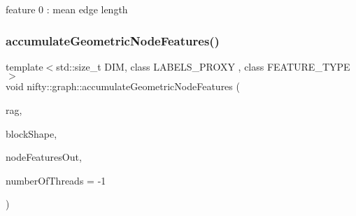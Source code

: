 feature 0 \+: mean edge length \mbox{\label{namespacenifty_1_1graph_a11bcf8795f57d9e5200fa52c1fb3a883}} 
\subsubsection{\texorpdfstring{accumulate\+Geometric\+Node\+Features()}{accumulateGeometricNodeFeatures()}}
{\footnotesize\ttfamily template$<$std\+::size\+\_\+t D\+IM, class L\+A\+B\+E\+L\+S\+\_\+\+P\+R\+O\+XY , class F\+E\+A\+T\+U\+R\+E\+\_\+\+T\+Y\+PE $>$ \\
void nifty\+::graph\+::accumulate\+Geometric\+Node\+Features (\begin{DoxyParamCaption}\item[{const \hyperlink{classnifty_1_1graph_1_1GridRag}{Grid\+Rag}$<$ D\+IM, L\+A\+B\+E\+L\+S\+\_\+\+P\+R\+O\+XY $>$ \&}]{rag,  }\item[{const \hyperlink{namespacenifty_1_1array_a683f151f19c851754e0c6d55ed16a0c2}{array\+::\+Static\+Array}$<$ int64\+\_\+t, D\+IM $>$ \&}]{block\+Shape,  }\item[{\hyperlink{classandres_1_1View}{marray\+::\+View}$<$ F\+E\+A\+T\+U\+R\+E\+\_\+\+T\+Y\+PE $>$ \&}]{node\+Features\+Out,  }\item[{const int}]{number\+Of\+Threads = {\ttfamily -\/1} }\end{DoxyParamCaption})}

\mbox{\label{namespacenifty_1_1graph_afa27dafc0727ab9fb2d7e5e5fa23996b}} 
